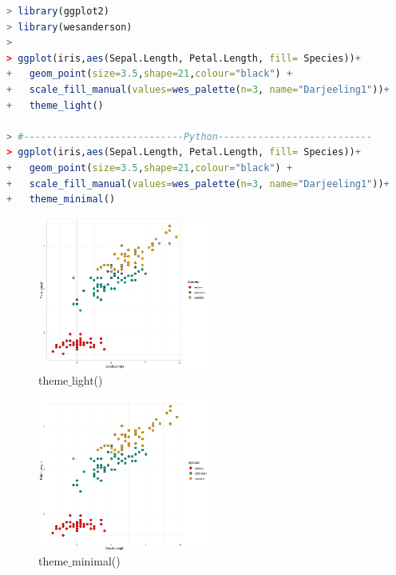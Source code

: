 \documentclass[11pt,a4paper,oneside]{book}
\begin{document}
\begin{lstlisting}[language=r]
> library(ggplot2)
> library(wesanderson)
> 
> ggplot(iris,aes(Sepal.Length, Petal.Length, fill= Species))+
+   geom_point(size=3.5,shape=21,colour="black") +
+   scale_fill_manual(values=wes_palette(n=3, name="Darjeeling1"))+
+   theme_light()

> #----------------------------Python---------------------------
> ggplot(iris,aes(Sepal.Length, Petal.Length, fill= Species))+
+   geom_point(size=3.5,shape=21,colour="black") +
+   scale_fill_manual(values=wes_palette(n=3, name="Darjeeling1"))+
+   theme_minimal()
\end{lstlisting}
\begin{figure}[H]
	\centering
	\includegraphics[width=0.5\textwidth]{screenshot014}
	\caption{theme$ \_ $light()}
	\label{fig:screenshot014}
\end{figure}
\begin{figure}[H]
	\centering
	\includegraphics[width=0.5\textwidth]{screenshot038}
	\caption{theme$ \_ $minimal()}
	\label{fig:screenshot038}
\end{figure}
\end{document}
